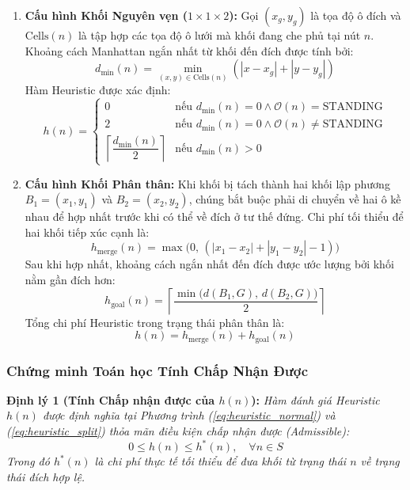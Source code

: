 \begin{enumerate}[1.]
    \item \textbf{Cấu hình Khối Nguyên vẹn ($1 \times 1 \times 2$):}
    Gọi $(x_g, y_g)$ là tọa độ ô đích và $\text{Cells}(n)$ là tập hợp các
    tọa độ ô lưới mà khối đang che phủ tại nút $n$. Khoảng cách Manhattan
    ngắn nhất từ khối đến đích được tính bởi:
    \begin{equation}
        d_{\min}(n) = \min_{(x, y) \in \text{Cells}(n)} (|x - x_g| + |y - y_g|)
    \end{equation}
    Hàm Heuristic được xác định:
    \begin{equation}
        h(n) =
        \begin{cases}
            0 & \text{nếu } d_{\min}(n) = 0 \land
            \mathcal{O}(n) = \text{STANDING} \\
            2 & \text{nếu } d_{\min}(n) = 0 \land
            \mathcal{O}(n) \neq \text{STANDING} \\
            \left\lceil \dfrac{d_{\min}(n)}{2} \right\rceil &
            \text{nếu } d_{\min}(n) > 0
        \end{cases}
        \label{eq:heuristic_normal}
    \end{equation}

    \item \textbf{Cấu hình Khối Phân thân:}
    Khi khối bị tách thành hai khối lập phương $B_1 = (x_1, y_1)$ và
    $B_2 = (x_2, y_2)$, chúng bắt buộc phải di chuyển về hai ô kề nhau
    để hợp nhất trước khi có thể về đích ở tư thế đứng. Chi phí tối thiểu
    để hai khối tiếp xúc cạnh là:
    \begin{equation}
        h_{\text{merge}}(n) = \max\Big(0, \,
        (|x_1 - x_2| + |y_1 - y_2| - 1)\Big)
    \end{equation}
    Sau khi hợp nhất, khoảng cách ngắn nhất đến đích được ước lượng bởi khối
    nằm gần đích hơn:
    \begin{equation}
        h_{\text{goal}}(n) = \left\lceil
        \dfrac{\min\Big(d(B_1, G), \, d(B_2, G)\Big)}{2} \right\rceil
    \end{equation}
    Tổng chi phí Heuristic trong trạng thái phân thân là:
    \begin{equation}
        h(n) = h_{\text{merge}}(n) + h_{\text{goal}}(n)
        \label{eq:heuristic_split}
    \end{equation}
\end{enumerate}

\subsubsection{Chứng minh Toán học Tính Chấp Nhận Được}
\noindent
\textbf{Định lý 1 (Tính Chấp nhận được của $h(n)$):}
\textit{Hàm đánh giá Heuristic $h(n)$ được định nghĩa tại Phương trình
(\ref{eq:heuristic_normal}) và (\ref{eq:heuristic_split}) thỏa mãn điều kiện
chấp nhận được (\textit{Admissible}):}
\begin{equation}
    0 \le h(n) \le h^*(n), \quad \forall n \in S
\end{equation}
\textit{Trong đó $h^*(n)$ là chi phí thực tế tối thiểu để đưa khối từ trạng
thái $n$ về trạng thái đích hợp lệ.}

